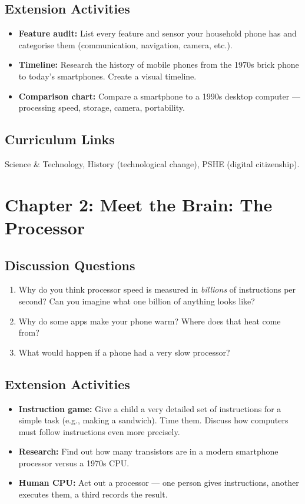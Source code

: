 \subsection*{Extension Activities}
\begin{itemize}
  \item \textbf{Feature audit:} List every feature and sensor your household phone has and categorise them (communication, navigation, camera, etc.).
  \item \textbf{Timeline:} Research the history of mobile phones from the 1970s brick phone to today's smartphones. Create a visual timeline.
  \item \textbf{Comparison chart:} Compare a smartphone to a 1990s desktop computer — processing speed, storage, camera, portability.
\end{itemize}

\subsection*{Curriculum Links}
Science \& Technology, History (technological change), PSHE (digital citizenship).

\sectionrule

\section*{Chapter 2: Meet the Brain: The Processor}

\subsection*{Discussion Questions}
\begin{enumerate}
  \item Why do you think processor speed is measured in \emph{billions} of instructions per second? Can you imagine what one billion of anything looks like?
  \item Why do some apps make your phone warm? Where does that heat come from?
  \item What would happen if a phone had a very slow processor?
\end{enumerate}

\subsection*{Extension Activities}
\begin{itemize}
  \item \textbf{Instruction game:} Give a child a very detailed set of instructions for a simple task (e.g., making a sandwich). Time them. Discuss how computers must follow instructions even more precisely.
  \item \textbf{Research:} Find out how many transistors are in a modern smartphone processor versus a 1970s CPU.
  \item \textbf{Human CPU:} Act out a processor — one person gives instructions, another executes them, a third records the result.
\end{itemize}

